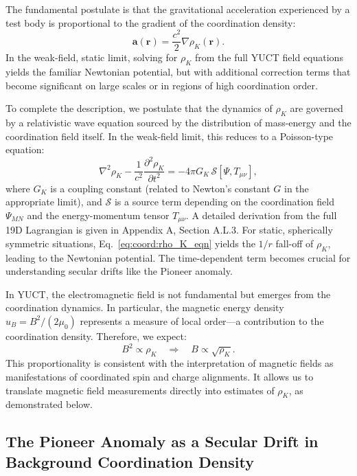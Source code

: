 \documentclass[12pt,a4paper]{article}
\theoremstyle{remark}
\begin{document}
	The fundamental postulate is that the gravitational acceleration experienced by a test body is proportional to the gradient of the coordination density:
	\begin{equation}
		\mathbf{a}(\mathbf{r}) = \frac{c^2}{2} \nabla \rho_K(\mathbf{r}).
		\label{eq:coord:grav_from_rho}
	\end{equation}
	In the weak-field, static limit, solving for \(\rho_K\) from the full YUCT field equations yields the familiar Newtonian potential, but with additional correction terms that become significant on large scales or in regions of high coordination order.
	
	To complete the description, we postulate that the dynamics of \(\rho_K\) are governed by a relativistic wave equation sourced by the distribution of mass-energy and the coordination field itself. In the weak-field limit, this reduces to a Poisson-type equation:
	\begin{equation}
		\nabla^2 \rho_K - \frac{1}{c^2}\frac{\partial^2 \rho_K}{\partial t^2} = -4\pi G_K \, \mathcal{S}[\Psi, T_{\mu\nu}],
		\label{eq:coord:rho_K_eqn}
	\end{equation}
	where \(G_K\) is a coupling constant (related to Newton's constant \(G\) in the appropriate limit), and \(\mathcal{S}\) is a source term depending on the coordination field \(\Psi_{MN}\) and the energy-momentum tensor \(T_{\mu\nu}\). A detailed derivation from the full 19D Lagrangian is given in Appendix A, Section A.L.3. For static, spherically symmetric situations, Eq.~\eqref{eq:coord:rho_K_eqn} yields the \(1/r\) fall-off of \(\rho_K\), leading to the Newtonian potential. The time-dependent term becomes crucial for understanding secular drifts like the Pioneer anomaly.
	
	In YUCT, the electromagnetic field is not fundamental but emerges from the coordination dynamics. In particular, the magnetic energy density \(u_B = B^2/(2\mu_0)\) represents a measure of local order—a contribution to the coordination density. Therefore, we expect:
	\begin{equation}
		B^2 \propto \rho_K \quad \Longrightarrow \quad B \propto \sqrt{\rho_K}.
		\label{eq:coord:B_rho}
	\end{equation}
	This proportionality is consistent with the interpretation of magnetic fields as manifestations of coordinated spin and charge alignments. It allows us to translate magnetic field measurements directly into estimates of \(\rho_K\), as demonstrated below.
	
	\subsection{The Pioneer Anomaly as a Secular Drift in Background Coordination Density}
	\label{subsec:coord:pioneer}
	
\end{document}
